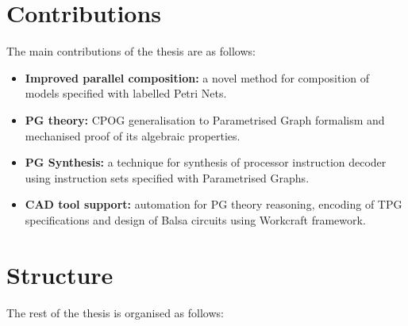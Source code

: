 \section{Contributions}

The main contributions of the thesis are as follows:

\begin{itemize}
\item
\textbf{Improved parallel composition:} a novel method for composition of models specified with labelled Petri Nets.

\item
\textbf{PG theory:} CPOG generalisation to Parametrised Graph formalism and mechanised proof of its algebraic properties.

\item
\textbf{PG Synthesis:} a technique for synthesis of processor instruction decoder using instruction sets specified with Parametrised Graphs.

\item
\textbf{CAD tool support:} automation for PG theory reasoning, encoding of TPG specifications and design of Balsa circuits using Workcraft framework.

\end{itemize}

\section{Structure}

The rest of the thesis is organised as follows:

